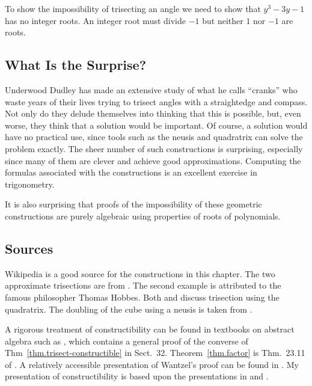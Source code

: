 To show the impossibility of trisecting an angle we need to show that $y^3-3y-1$ has no integer roots. An integer root must divide $-1$ but neither $1$ nor $-1$ are roots.

\subsection*{What Is the Surprise?}

Underwood Dudley has made an extensive study of what he calls ``cranks'' who waste years of their lives trying to trisect angles with a straightedge and compass. Not only do they delude themselves into thinking that this is possible, but, even worse, they think that a solution would be important. Of course, a solution would have no practical use, since tools such as the neusis and quadratrix can solve the problem exactly. The sheer number of such constructions is surprising, especially since many of them are clever and achieve good approximations. Computing the formulas associated with the constructions is an excellent exercise in trigonometry.

It is also surprising that proofs of the impossibility of these geometric constructions are purely algebraic using properties of roots of polynomials.

\subsection*{Sources}

Wikipedia \cite{wiki:tri, wiki:neu, wiki:quad} is a good source for the constructions in this chapter.
The two approximate trisections are from \cite[pp.
~67--68, 95--96]{dudley-budget}. The second example is attributed to the famous philosopher Thomas Hobbes. Both \cite[pp.~48--49]{martin} and \cite[pp.~6--7]{dudley-budget} discuss trisection using the quadratrix.
The doubling of the cube using a neusis is taken from \cite{dorrie2}.

A rigorous treatment of constructibility can be found in textbooks on abstract algebra such as \cite{fraleigh}, which contains a general proof of the converse of Thm~\ref{thm.trisect-constructible} in Sect.~32.
Theorem~\ref{thm.factor} is Thm.~23.11 of \cite{fraleigh}.
A relatively accessible presentation of Wantzel's proof can be found in \cite{suzuki}. My presentation of constructibility is based upon the presentations in \cite[Chap.~III]{courant} and \cite{laugwitz}.
